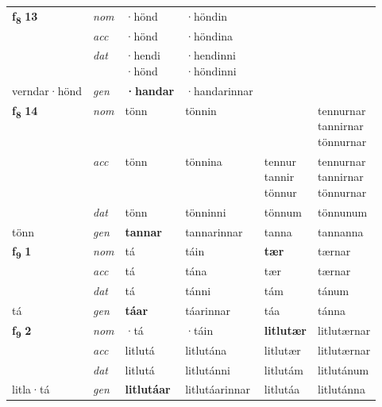 \begin{longtable}[l]{X>{\footnotesize\itshape}XXXXX}
\multirow{3}{*}{{{\textbf{f{\textsubscript{8}}} \Large{\textbf{13}}}}} & nom & ·hönd & ·höndin & \textbf{} &  \\*
 & acc & ·hönd & ·höndina &  &  \\*
 & dat & \specialcell{·hendi\\  ·hönd} & \specialcell{·hendinni\\  ·höndinni} &  &  \\*
 {\footnotesize{verndar\allowbreak ·hönd}} & gen & \textbf{·handar} & ·handarinnar &  &  \\
\midrule

\multirow{3}{*}{{{\textbf{f{\textsubscript{8}}} \Large{\textbf{14}}}}} & nom & tönn & tönnin & \textbf{\specialcell{tennur\\ tannir\\ tönnur}} & \specialcell{tennurnar\\ tannirnar\\ tönnurnar} \\*
 & acc & tönn & tönnina & \specialcell{tennur\\ tannir\\ tönnur} & \specialcell{tennurnar\\ tannirnar\\ tönnurnar} \\*
 & dat & tönn & tönninni & tönnum & tönnunum \\*
 {\footnotesize{tönn}} & gen & \textbf{tannar} & tannarinnar & tanna & tannanna \\
\midrule

\multirow{3}{*}{{{\textbf{f{\textsubscript{9}}} \Large{\textbf{1}}}}} & nom & tá & táin & \textbf{tær} & tærnar \\*
 & acc & tá & tána & tær & tærnar \\*
 & dat & tá & tánni & tám & tánum \\*
 {\footnotesize{tá}} & gen & \textbf{táar} & táarinnar & táa & tánna \\
\midrule

\multirow{3}{*}{{{\textbf{f{\textsubscript{9}}} \Large{\textbf{2}}}}} & nom & ·tá & ·táin & \textbf{litlutær} & litlutærnar \\*
 & acc & litlutá & litlutána & litlutær & litlutærnar \\*
 & dat & litlutá & litlutánni & litlutám & litlutánum \\*
 {\footnotesize{litla\allowbreak ·tá}} & gen & \textbf{litlutáar} & litlutáarinnar & litlutáa & litlutánna \\
\midrule


\end{longtable}
